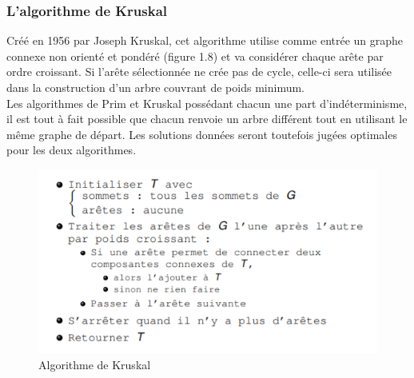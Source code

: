 \documentclass[memoire.tex]{subfiles}
\begin{document}
\subsubsection{L’algorithme de Kruskal}
Créé en 1956 par Joseph Kruskal,  cet algorithme utilise comme entrée un graphe connexe non orienté et pondéré (figure 1.8) et va considérer chaque arête par ordre croissant. Si l’arête sélectionnée ne crée pas de cycle, celle-ci sera utilisée dans la construction d’un arbre couvrant de poids minimum.\\
Les algorithmes de Prim et Kruskal possédant chacun une part d’indéterminisme, il est tout à fait possible que chacun renvoie un arbre différent tout en utilisant le même graphe de départ. Les solutions données seront toutefois jugées optimales pour les deux algorithmes.
	\begin{figure}[h!]
		\centerline{\includegraphics[scale=0.8]{img/kruskal.png}}
		\caption{Algorithme de Kruskal}
	\end{figure}
\newpage
\end{document}
